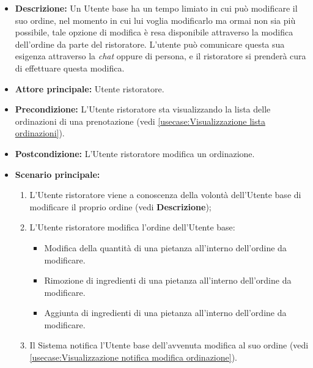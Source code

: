 \label{usecase:Modifica ordinazione}
\begin{itemize}

	\item \textbf{Descrizione:} Un Utente base ha un tempo limiato in cui può modificare il suo ordine, nel momento in cui lui voglia modificarlo ma ormai non sia più possibile, tale opzione di modifica è resa disponibile
	      attraverso la modifica dell'ordine da parte del ristoratore. L'utente può comunicare questa sua esigenza attraverso la \textit{chat} oppure di persona, e il ristoratore si prenderà cura di effettuare questa modifica.

	\item \textbf{Attore principale:} Utente ristoratore.

	\item \textbf{Precondizione:} L'Utente ristoratore sta visualizzando la lista delle ordinazioni di una prenotazione (vedi \autoref{usecase:Visualizzazione lista ordinazioni}).

	\item \textbf{Postcondizione:} L'Utente ristoratore modifica un ordinazione.

	\item \textbf{Scenario principale:}
	      \begin{enumerate}
		      \item L'Utente ristoratore viene a conoscenza della volontà
		            dell'Utente base di modificare il proprio ordine (vedi \textbf{Descrizione});
		      \item L'Utente ristoratore modifica l'ordine dell'Utente base:
		            \begin{itemize}
			            \item Modifica della quantità di una pietanza all'interno dell'ordine da modificare.
			            \item Rimozione di ingredienti di una pietanza all'interno dell'ordine da modificare.
			            \item Aggiunta di ingredienti di una pietanza all'interno dell'ordine da modificare.
		            \end{itemize}
		      \item Il Sistema notifica l'Utente base dell'avvenuta modifica al suo ordine (vedi \autoref{usecase:Visualizzazione notifica modifica ordinazione}).
	      \end{enumerate}

\end{itemize}

